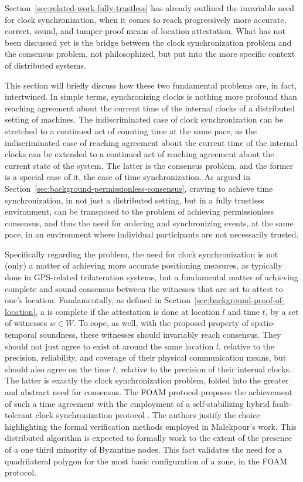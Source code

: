 Section~\ref{sec:related-work-fully-trustless} has already outlined the invariable need for clock synchronization, when it comes to reach progressively more accurate, correct, sound, and tamper-proof means of location attestation. What has not been discussed yet is the bridge between the clock synchronization problem and the consensus problem, not philosophized, but put into the more specific context of distributed systems. 

This section will briefly discuss how these two fundamental problems are, in fact, intertwined. In simple terms, synchronizing clocks is nothing more profound than reaching agreement about the current time of the internal clocks of a distributed setting of machines. The indiscriminated case of clock synchronization can be stretched to a continued act of counting time at the same pace, as the indiscriminated case of reaching agreement about the current time of the internal clocks can be extended to a continued act of reaching agreement about the current state of the system. The latter is the consensus problem, and the former is a special case of it, the case of time synchronization. As argued in Section~\ref{sec:background-permissionless-consensus}, craving to achieve time synchronization, in not just a distributed setting, but in a fully trustless environment, can be transposed to the problem of achieving permissionless consensus, and thus the need for ordering and synchronizing events, at the same pace, in an environment where individual participants are not necessarily trusted.

Specifically regarding the \pol{} problem, the need for clock synchronization is not (only) a matter of achieving more accurate positioning measures, as typically done in GPS-related trilateration systems, but a fundamental matter of achieving complete and sound consensus between the witnesses that are set to attest to one's location. Fundamentally, as defined in Section~\ref{sec:background-proof-of-location}, a \pol{} is complete if the attestation is done at location $l$ and time $t$, by a set of witnesses $w \in W$. To cope, as well, with the proposed property of spatio-temporal soundness, these witnesses should invariably reach consensus. They should not just agree to exist at around the same location $l$, relative to the precision, reliability, and coverage of their physical communication means, but should also agree on the time $t$, relative to the precision of their internal clocks. The latter is exactly the clock synchronization problem, folded into the greater and abstract need for consensus. The FOAM protocol proposes the achievement of such a time agreement with the employment of a self-stabilizing hybrid fault-tolerant clock synchronization protocol \cite{foam-white-paper, malekpour2015self}. The authors justify the choice highlighting the formal verification methods employed in Malekpour's work. This distributed algorithm is expected to formally work to the extent of the presence of a one third minority of Byzantine nodes. This fact validates the need for a quadrilateral polygon for the most basic configuration of a zone, in the FOAM protocol. 

